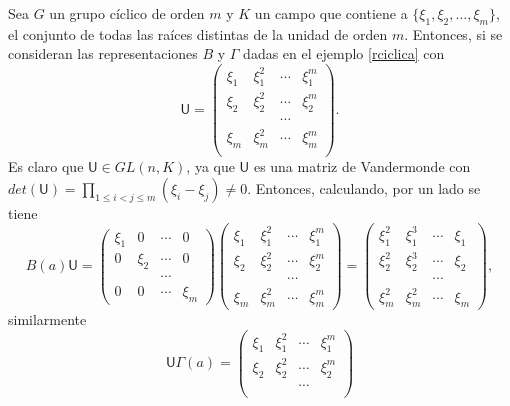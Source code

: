 \begin{ejemplo}\label{ejemciclico}
Sea $G$ un grupo cíclico de orden $m$ y $K$ un campo que contiene a $\{ \xi_1, \xi_2, \dots, \xi_m \}$, el conjunto de todas las raíces distintas de la unidad de orden $m$. Entonces, si se consideran las representaciones $B$ y $\Gamma$ dadas en el ejemplo \ref{rciclica} con 
\begin{equation*} \mathsf{U} = \begin{pmatrix}
\xi_1 & \xi_1^2 & \cdots & \xi_1^m \\
\xi_2 & \xi_2^2 & \cdots & \xi_2^m \\
 & & \cdots & \\
 \xi_m & \xi_m^2 & \cdots & \xi_m^m \\ 
\end{pmatrix}. \end{equation*}
Es claro que $\mathsf{U} \in GL(n,K)$, ya que $\mathsf{U}$ es una matriz de Vandermonde con $det(\mathsf{U}) = \prod_{1 \leq i < j \leq m}(\xi_i - \xi_j) \neq 0$. Entonces, calculando, por un lado se tiene 
\begin{equation*} B(a)\mathsf{U} = \begin{pmatrix}
\xi_1 & 0 & \cdots & 0\\
0 & \xi_2 & \cdots & 0\\
 & & \cdots & \\
 0 & 0 & \cdots & \xi_m
\end{pmatrix} \begin{pmatrix}
\xi_1 & \xi_1^2 & \cdots & \xi_1^m \\
\xi_2 & \xi_2^2 & \cdots & \xi_2^m \\
 & & \cdots & \\
 \xi_m & \xi_m^2 & \cdots & \xi_m^m
\end{pmatrix} = \begin{pmatrix}
\xi_1^2 & \xi_1^3 & \cdots & \xi_1 \\
\xi_2^2 & \xi_2^3 & \cdots & \xi_2 \\
 & & \cdots & \\
\xi_m^2 & \xi_m^2 & \cdots & \xi_m
\end{pmatrix}, \end{equation*} similarmente \begin{equation*} 
\mathsf{U}\Gamma(a) = 
\begin{pmatrix}
\xi_1 & \xi_1^2 & \cdots & \xi_1^m \\
\xi_2 & \xi_2^2 & \cdots & \xi_2^m \\
 & & \cdots & \\

\end{pmatrix}
\end{equation*}
\end{ejemplo}
